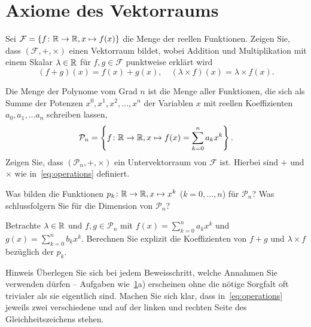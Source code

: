 \documentclass{scrartcl}
\newcommand{\FF}{\mathcal{F}}
\newcommand{\PP}{\mathcal{P}}
\begin{document}
\maketitle

\section{Axiome des Vektorraums}
\label{ex:functionspace}
\begin{subex}
  \item Sei $\FF = \{ f\colon \RR\to\RR, x \mapsto f(x) \}$ die Menge der reellen Funktionen.
  Zeigen Sie, dass $(\FF,+,\times)$ einen Vektorraum bildet, wobei Addition und Multiplikation mit einem Skalar $\lambda \in \mathbb{R}$ für $f, g \in \FF$ punktweise erklärt wird
  \[
    \label{eq:operations}\tag{*}
    (f + g)(x) = f(x) + g(x), \quad (\lambda \times f)(x) = \lambda \times f(x).
  \]

  \item Die Menge der Polynome vom Grad $n$ ist die Menge aller Funktionen, die sich als Summe der Potenzen $x^0,x^1,x^2,\dots, x^n$ der Variablen $x$ mit reellen Koeffizienten $a_0, a_1, \dots a_n$ schreiben lassen,
  \[
    \PP_n  = \left\{ f\colon \RR \to \RR, x \mapsto f(x) = \sum_{k=0}^n a_k x^k \right\}.
  \]
  Zeigen Sie, dass $(\PP_n,+,\times)$ ein Untervektorraum von $\FF$ ist.
  Hierbei sind $+$ und $\times$ wie in~\eqref{eq:operations} definiert.

  \item Was bilden die Funktionen $p_k\colon \mathbb{R} \to \mathbb{R}, x \mapsto x^k$ ($k=0,\ldots,n$) für $\PP_n$?
  Was schlussfolgern Sie für die Dimension von $\PP_n$?

  \item Betrachte $\lambda \in \mathbb{R}$ und $f,g \in \PP_n$ mit $f(x) = \sum_{k=0}^n a_k x^k$ und $g(x) = \sum_{k=0}^n b_k x^k$.
  Berechnen Sie explizit die Koeffizienten von $f + g$ und $\lambda \times f$ bezüglich der $p_k$.
\end{subex}

\begin{remark}{Hinweis}
  Überlegen Sie sich bei jedem Beweisschritt, welche Annahmen Sie verwenden dürfen -- Aufgaben wie~\ref{ex:functionspace}a) erscheinen ohne die nötige Sorgfalt oft trivialer als sie eigentlich sind.
  Machen Sie sich klar, dass in~\eqref{eq:operations} jeweils zwei verschiedene \quotes{$+$} und \quotes{$\times$} auf der linken und rechten Seite des Gleichheitszeichens stehen.
\end{remark}
\end{document}
